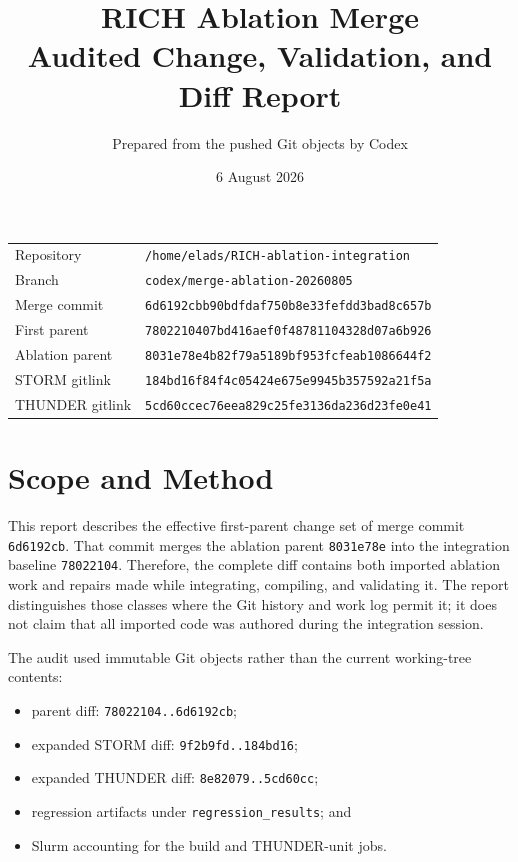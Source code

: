 \documentclass[10pt,a4paper]{article}
\title{\textbf{RICH Ablation Merge}\\[3pt]
  Audited Change, Validation, and Diff Report}
\author{Prepared from the pushed Git objects by Codex}
\date{6 August 2026}
\newcommand{\commit}[1]{\texttt{#1}}
\newcommand{\file}[1]{\nolinkurl{#1}}
\begin{document}
\maketitle

\begin{center}
\begin{tabular}{@{}ll@{}}
\toprule
Repository & \file{/home/elads/RICH-ablation-integration} \\
Branch & \file{codex/merge-ablation-20260805} \\
Merge commit & \commit{6d6192cbb90bdfdaf750b8e33fefdd3bad8c657b} \\
First parent & \commit{7802210407bd416aef0f48781104328d07a6b926} \\
Ablation parent & \commit{8031e78e4b82f79a5189bf953fcfeab1086644f2} \\
STORM gitlink & \commit{184bd16f84f4c05424e675e9945b357592a21f5a} \\
THUNDER gitlink & \commit{5cd60ccec76eea829c25fe3136da236d23fe0e41} \\
\bottomrule
\end{tabular}
\end{center}

\tableofcontents
\clearpage

\section{Scope and Method}

This report describes the effective first-parent change set of merge commit
\commit{6d6192cb}.  That commit merges the ablation parent
\commit{8031e78e} into the integration baseline \commit{78022104}.  Therefore,
the complete diff contains both imported ablation work and repairs made while
integrating, compiling, and validating it.  The report distinguishes those
classes where the Git history and work log permit it; it does not claim that
all imported code was authored during the integration session.

The audit used immutable Git objects rather than the current working-tree
contents:
\begin{itemize}
  \item parent diff: \commit{78022104..6d6192cb};
  \item expanded STORM diff: \commit{9f2b9fd..184bd16};
  \item expanded THUNDER diff: \commit{8e82079..5cd60cc};
  \item regression artifacts under \file{regression_results}; and
  \item Slurm accounting for the build and THUNDER-unit jobs.
\end{itemize}
\end{document}
